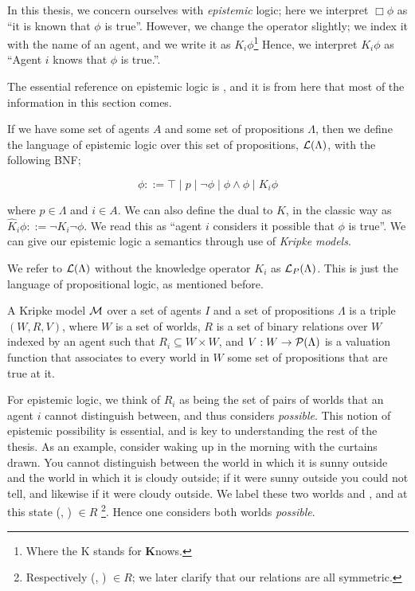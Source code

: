 \documentclass[ %
                    author={Leo Poulson},
                supervisor={Dr. Steven Ramsay},
                    degree={BSc},
                     title={Epistemic Planning for the Dynamic Gossip problem},
                  subtitle={},
                      year={2019} ]{dissertation}
\begin{document}
In this thesis, we concern ourselves with \emph{epistemic} logic; here we
interpret $\Box \phi$ as ``it is known that $\phi$ is true''. However, we
change the operator slightly; we index it with the name of an agent, and we
write it as $K_i \phi$\footnote{Where the K stands for \textbf{K}nows.} Hence,
we interpret $K_i \phi$ as ``Agent $i$ knows that $\phi$ is true.''.

The essential reference on epistemic logic is \cite{ReasoningAboutKnowledge},
and it is from here that most of the information in this section comes.
  
If we have some set of agents $A$ and some set of propositions $\Lambda$, then
we define the language of epistemic logic over this set of propositions,
$\mathcal{L}(\Lambda)$, with the following BNF;

\begin{equation*}
  \phi ::= \top \mid p \mid \neg \phi \mid \phi \land \phi \mid K_i \phi
\end{equation*}

\noindent where $p \in \Lambda$ and $i \in A$. We can also define the dual to
$K$, in the classic way as $\widehat K_i \phi ::= \neg K_i \neg \phi$. We read
this as ``agent $i$ considers it possible that $\phi$ is true''. We can give our
epistemic logic a semantics through use of \emph{Kripke models}.

We refer to $\mathcal{L}(\Lambda)$ without the knowledge operator $K_i$ as
$\mathcal{L}_P(\Lambda)$. This is just the language of propositional logic, as
mentioned before. 

A Kripke model $\mathcal{M}$ over a set of agents $I$ and a set of propositions
$\Lambda$ is a triple $(W, R, V)$, where $W$ is a set of worlds, $R$ is a set of
binary relations over $W$ indexed by an agent such that $R_i \subseteq W \times
W$, and $V : W \rightarrow \mathcal{P}(\Lambda)$ is a valuation function that
associates to every world in $W$ some set of propositions that are true at it.

For epistemic logic, we think of $R_i$ as being the set of pairs of worlds that
an agent $i$ cannot distinguish between, and thus considers \emph{possible}.
This notion of epistemic possibility is essential, and is key to understanding
the rest of the thesis. As an example, consider waking up in the morning with
the curtains drawn. You cannot distinguish between the world in which it is sunny
outside and the world in which it is cloudy outside; if it were sunny outside you
could not tell, and likewise if it were cloudy outside. We label these two
worlds \Sun and \Cloud, and at this state (\Sun, \Cloud) $\in R$
\footnote{Respectively (\Cloud, \Sun) $\in R$; we later clarify that our
  relations are all symmetric.}. Hence one
considers both worlds \emph{possible}.
\end{document}
